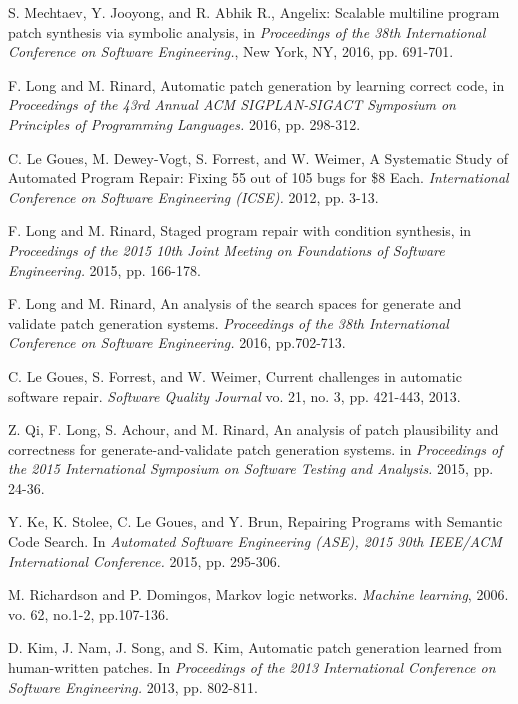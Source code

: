 \documentclass{paper}
\begin{document}
\begin{thebibliography}{99}

 S. Mechtaev, Y. Jooyong, and  R. Abhik R., Angelix: Scalable multiline program patch synthesis via symbolic analysis, in \textit{Proceedings of the 38th International Conference on Software Engineering.}, New York, NY, 2016, pp. 691-701.

 F. Long and M. Rinard, Automatic patch generation by learning correct code, in \textit{Proceedings of the 43rd Annual ACM SIGPLAN-SIGACT Symposium on Principles of Programming Languages.} 2016, pp. 298-312. 

 C. Le Goues, M. Dewey-Vogt, S. Forrest, and W. Weimer, A Systematic Study of Automated Program Repair: Fixing 55 out of 105 bugs for \$8 Each. \textit{ International Conference on Software Engineering (ICSE).} 2012, pp. 3-13.

 F. Long and M. Rinard, Staged program repair with condition synthesis, in \textit{Proceedings of the 2015 10th Joint Meeting on Foundations of Software Engineering.}  2015, pp. 166-178.

 F. Long and M. Rinard, An analysis of the search spaces for generate and validate patch generation systems. \textit{Proceedings of the 38th International Conference on Software Engineering.} 2016, pp.702-713.

 C. Le Goues, S. Forrest, and W. Weimer, Current challenges in automatic software repair. \textit{Software Quality Journal} vo. 21, no. 3, pp. 421-443, 2013.

 Z. Qi, F. Long, S. Achour, and M. Rinard, An analysis of patch plausibility and correctness for generate-and-validate patch generation systems. in \textit{Proceedings of the 2015 International Symposium on Software Testing and Analysis.}  2015, pp. 24-36. 

  Y. Ke, K. Stolee, C. Le Goues, and Y. Brun, Repairing Programs with Semantic Code Search. In \textit{Automated Software Engineering (ASE), 2015 30th IEEE/ACM International Conference.} 2015, pp. 295-306. 

  M. Richardson and P. Domingos, Markov logic networks. \textit{Machine learning}, 2006. vo. 62, no.1-2, pp.107-136.

 D. Kim, J. Nam, J. Song, and S. Kim, Automatic patch generation learned from human-written patches. In \textit{Proceedings of the 2013 International Conference on Software Engineering.}  2013, pp. 802-811.


\end{thebibliography}
\end{document}
